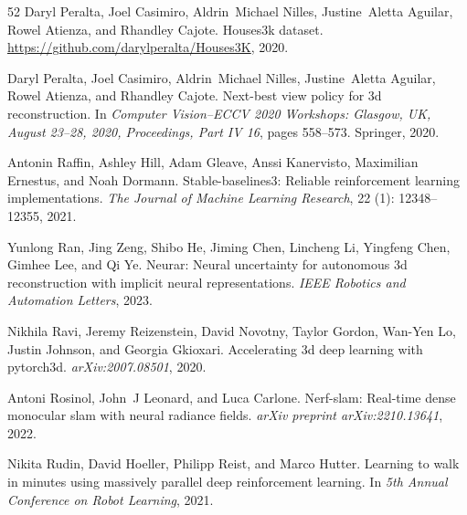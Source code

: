 \documentclass[10pt,twocolumn,letterpaper]{article}
\begin{document}
{\begin{thebibliography}{52}
Daryl Peralta, Joel Casimiro, Aldrin~Michael Nilles, Justine~Aletta Aguilar, Rowel Atienza, and Rhandley Cajote.
\newblock Houses3k dataset.
\newblock \url{https://github.com/darylperalta/Houses3K}, 2020{}.

Daryl Peralta, Joel Casimiro, Aldrin~Michael Nilles, Justine~Aletta Aguilar, Rowel Atienza, and Rhandley Cajote.
\newblock Next-best view policy for 3d reconstruction.
\newblock In \emph{Computer Vision--ECCV 2020 Workshops: Glasgow, UK, August 23--28, 2020, Proceedings, Part IV 16}, pages 558--573. Springer, 2020{}.

Antonin Raffin, Ashley Hill, Adam Gleave, Anssi Kanervisto, Maximilian Ernestus, and Noah Dormann.
\newblock Stable-baselines3: Reliable reinforcement learning implementations.
\newblock \emph{The Journal of Machine Learning Research}, 22 (1): 12348--12355, 2021.

Yunlong Ran, Jing Zeng, Shibo He, Jiming Chen, Lincheng Li, Yingfeng Chen, Gimhee Lee, and Qi Ye.
\newblock Neurar: Neural uncertainty for autonomous 3d reconstruction with implicit neural representations.
\newblock \emph{IEEE Robotics and Automation Letters}, 2023.

Nikhila Ravi, Jeremy Reizenstein, David Novotny, Taylor Gordon, Wan-Yen Lo, Justin Johnson, and Georgia Gkioxari.
\newblock Accelerating 3d deep learning with pytorch3d.
\newblock \emph{arXiv:2007.08501}, 2020.

Antoni Rosinol, John~J Leonard, and Luca Carlone.
\newblock Nerf-slam: Real-time dense monocular slam with neural radiance fields.
\newblock \emph{arXiv preprint arXiv:2210.13641}, 2022.

Nikita Rudin, David Hoeller, Philipp Reist, and Marco Hutter.
\newblock Learning to walk in minutes using massively parallel deep reinforcement learning.
\newblock In \emph{5th Annual Conference on Robot Learning}, 2021.


\end{thebibliography}}
\end{document}
